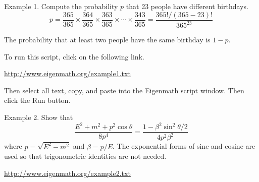 \documentclass[12pt]{article}
\begin{document}
\noindent
Example 1. Compute the probability $p$ that 23 people have different birthdays.
$$
p=\frac{365}{365}\times\frac{364}{365}\times\frac{363}{365}\times\cdots
\times\frac{343}{365}=\frac{365!/(365-23)!}{365^{23}}
$$

\noindent
The probability that at least two people have the same birthday is $1-p$.



\noindent
To run this script, click on the following link.

\bigskip
\noindent
\url{http://www.eigenmath.org/example1.txt}

\bigskip
\noindent
Then select all text, copy, and paste into the Eigenmath script window.
Then click the Run button.

\begin{center}
\end{center}

\newpage
\noindent
Example 2. Show that
$$
\frac{E^2+m^2+p^2\cos\theta}{8p^4}
=\frac{1-\beta^2\sin^2\theta/2}{4p^2\beta^2}
$$
where $p=\sqrt{E^2-m^2}$ and $\beta=p/E$.
The exponential forms of sine and cosine are used
so that trigonometric identities are not needed.



\noindent
\url{http://www.eigenmath.org/example2.txt}
\end{document}
